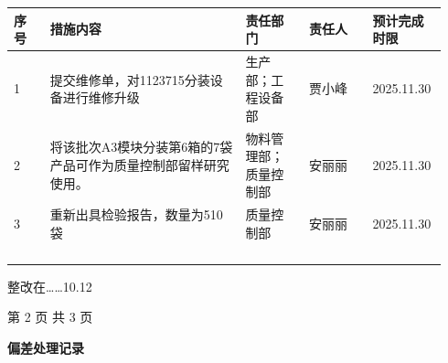 \documentclass[UTF8,10pt,a4paper,fontset=fandol]{ctexart}
\newcommand{\fieldvalue}[1]{#1}
\newcommand{\handwritten}[1]{#1}
\begin{document}
\begin{tabular}{|p{0.08\linewidth}|p{0.43\linewidth}|p{0.14\linewidth}|p{0.14\linewidth}|p{0.15\linewidth}|}
\hline
序号 & 措施内容 & 责任部门 & 责任人 & 预计完成时限\\
\hline
1 &
\fieldvalue{提交维修单，对1123715分装设备进行维修升级} &
\fieldvalue{生产部；工程设备部} &
\fieldvalue{贾小峰} &
\fieldvalue{2025.11.30}\\
\hline
2 &
\fieldvalue{将该批次A3模块分装第6箱的7袋产品可作为质量控制部留样研究使用。} &
\fieldvalue{物料管理部；质量控制部} &
\fieldvalue{安丽丽} &
\fieldvalue{2025.11.30}\\
\hline
3 &
\fieldvalue{重新出具检验报告，数量为510袋} &
\fieldvalue{质量控制部} &
\fieldvalue{安丽丽} &
\fieldvalue{2025.11.30}\\
\hline
\multicolumn{5}{|c|}{}\\
\hline
\multicolumn{5}{|c|}{}\\
\hline
\multicolumn{5}{|c|}{}\\
\hline
\multicolumn{5}{|c|}{}\\
\hline
\end{tabular}

\handwritten{整改在……10.12}

\begin{center}
第 2 页 共 3 页
\end{center}

\newpage

\begin{center}
\small
\textbf{偏差处理记录}
\end{center}
\end{document}
